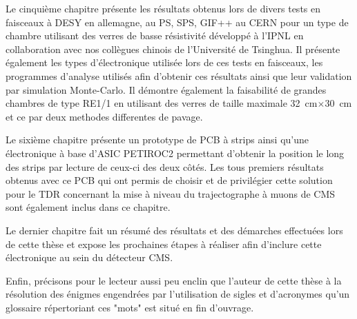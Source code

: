 Le cinquième chapitre présente les résultats obtenus lors de divers tests en faisceaux à DESY en allemagne, au PS, SPS, GIF++ au CERN pour un type de chambre utilisant des verres de basse résistivité développé à l'IPNL en collaboration avec nos collègues chinois de l'Université de Tsinghua. Il présente également les types d'électronique utilisée lors de ces tests en faisceaux, les programmes d'analyse utilisés afin d'obtenir ces résultats ainsi que leur validation par simulation Monte-Carlo. Il démontre également la faisabilité de grandes chambres de type RE1/1 en utilisant des verres de taille maximale \SI{32}{\centi\meter}$\times$\SI{30}{\centi\meter} et ce par deux methodes differentes de pavage.

Le sixième chapitre présente un prototype de PCB à strips ainsi qu'une électronique à base d'ASIC PETIROC2 permettant d'obtenir la position le long des strips par lecture de ceux-ci des deux côtés. Les tous premiers résultats obtenus avec ce PCB qui ont permis de choisir et de privilégier cette solution pour le TDR concernant la mise à niveau du trajectographe à muons de CMS sont également inclus dans ce chapitre.

Le dernier chapitre fait un résumé des résultats et des démarches effectuées lors de cette thèse et expose les prochaines étapes à réaliser afin d'inclure cette électronique au sein du détecteur CMS.

Enfin, précisons pour le lecteur aussi peu enclin que l'auteur de cette thèse à la résolution des énigmes engendrées par l'utilisation de sigles  et d'acronymes qu'un glossaire répertoriant ces "mots" est situé en fin d'ouvrage.


